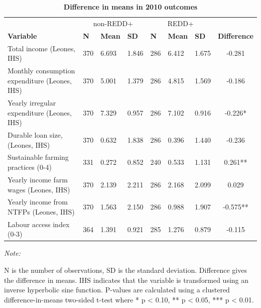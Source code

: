 \documentclass[
]{article}
\begin{document}
\begin{table}[!h]

\caption{\label{tab:tabSumstats2010}\textbf{Difference in means in 2010 outcomes}}
\centering
\begin{threeparttable}
\begin{tabular}[t]{lllllllc}
\toprule
\multicolumn{1}{c}{ } & \multicolumn{3}{c}{non-REDD+} & \multicolumn{3}{c}{REDD+} & \multicolumn{1}{c}{ } \\
\cmidrule(l{3pt}r{3pt}){2-4} \cmidrule(l{3pt}r{3pt}){5-7}
\textbf{Variable} & \textbf{N} & \textbf{Mean} & \textbf{SD} & \textbf{N} & \textbf{Mean} & \textbf{SD} & \textbf{Difference}\\
\midrule
Total income (Leones, IHS) & 370 & 6.693 & 1.846 & 286 & 6.412 & 1.675 & -0.281\\
Monthly consumption expenditure (Leones, IHS) & 370 & 5.001 & 1.379 & 286 & 4.815 & 1.569 & -0.186\\
Yearly irregular expenditure (Leones, IHS) & 370 & 7.329 & 0.957 & 286 & 7.102 & 0.916 & -0.226*\\
Durable loan size, (Leones, IHS) & 370 & 0.632 & 1.838 & 286 & 0.396 & 1.440 & -0.236\\
Sustainable farming practices (0-4) & 331 & 0.272 & 0.852 & 240 & 0.533 & 1.131 & 0.261**\\
Yearly income farm wages (Leones, IHS) & 370 & 2.139 & 2.211 & 286 & 2.168 & 2.099 & 0.029\\
Yearly income from NTFPs (Leones, IHS) & 370 & 1.563 & 2.150 & 286 & 0.988 & 1.907 & -0.575**\\
Labour access index (0-3) & 364 & 1.391 & 0.921 & 285 & 1.276 & 0.879 & -0.115\\
\bottomrule
\end{tabular}
\begin{tablenotes}
\item \textit{Note: } 
\item N is the number of observations, SD is the standard deviation. Difference gives the difference in means. IHS indicates that the variable is transformed using an inverse hyperbolic sine function. P-values are calculated using a clustered difference-in-means two-sided t-test where * p < 0.10, ** p < 0.05, *** p < 0.01.
\end{tablenotes}
\end{threeparttable}
\end{table}
\end{document}
